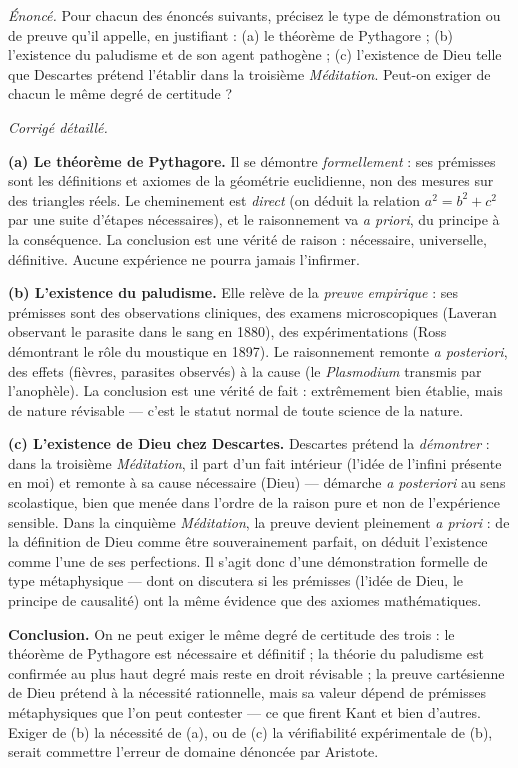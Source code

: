 \documentclass[11pt]{article}
\begin{document}
\begin{exoresolu}
\emph{Énoncé.} Pour chacun des énoncés suivants, précisez le type de démonstration ou de preuve qu'il appelle, en justifiant : (a) le théorème de Pythagore ; (b) l'existence du paludisme et de son agent pathogène ; (c) l'existence de Dieu telle que Descartes prétend l'établir dans la troisième \emph{Méditation}. Peut-on exiger de chacun le même degré de certitude ?

\tcblower

\emph{Corrigé détaillé.}

\textbf{(a) Le théorème de Pythagore.} Il se démontre \emph{formellement} : ses prémisses sont les définitions et axiomes de la géométrie euclidienne, non des mesures sur des triangles réels. Le cheminement est \emph{direct} (on déduit la relation $a^2 = b^2 + c^2$ par une suite d'étapes nécessaires), et le raisonnement va \emph{a priori}, du principe à la conséquence. La conclusion est une vérité de raison : nécessaire, universelle, définitive. Aucune expérience ne pourra jamais l'infirmer.

\textbf{(b) L'existence du paludisme.} Elle relève de la \emph{preuve empirique} : ses prémisses sont des observations cliniques, des examens microscopiques (Laveran observant le parasite dans le sang en 1880), des expérimentations (Ross démontrant le rôle du moustique en 1897). Le raisonnement remonte \emph{a posteriori}, des effets (fièvres, parasites observés) à la cause (le \emph{Plasmodium} transmis par l'anophèle). La conclusion est une vérité de fait : extrêmement bien établie, mais de nature révisable — c'est le statut normal de toute science de la nature.

\textbf{(c) L'existence de Dieu chez Descartes.} Descartes prétend la \emph{démontrer} : dans la troisième \emph{Méditation}, il part d'un fait intérieur (l'idée de l'infini présente en moi) et remonte à sa cause nécessaire (Dieu) — démarche \emph{a posteriori} au sens scolastique, bien que menée dans l'ordre de la raison pure et non de l'expérience sensible. Dans la cinquième \emph{Méditation}, la preuve devient pleinement \emph{a priori} : de la définition de Dieu comme être souverainement parfait, on déduit l'existence comme l'une de ses perfections. Il s'agit donc d'une démonstration formelle de type métaphysique — dont on discutera si les prémisses (l'idée de Dieu, le principe de causalité) ont la même évidence que des axiomes mathématiques.

\textbf{Conclusion.} On ne peut exiger le même degré de certitude des trois : le théorème de Pythagore est nécessaire et définitif ; la théorie du paludisme est confirmée au plus haut degré mais reste en droit révisable ; la preuve cartésienne de Dieu prétend à la nécessité rationnelle, mais sa valeur dépend de prémisses métaphysiques que l'on peut contester — ce que firent Kant et bien d'autres. Exiger de (b) la nécessité de (a), ou de (c) la vérifiabilité expérimentale de (b), serait commettre l'erreur de domaine dénoncée par Aristote.
\end{exoresolu}
\end{document}
